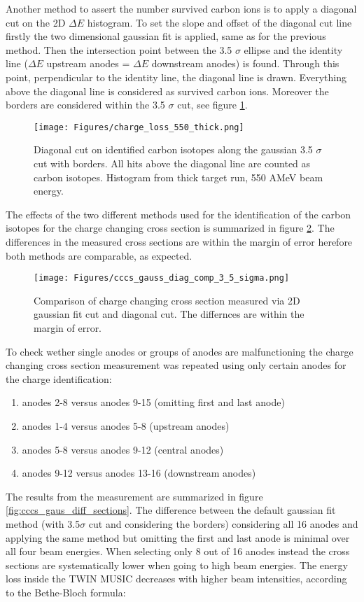 Another method to assert the number survived carbon ions is to apply a diagonal cut on the 2D $\Delta E$ histogram. To set the slope and offset of the diagonal cut line firstly the two dimensional gaussian fit is applied, same as for the previous method. Then the intersection point between the 3.5 $\sigma$ ellipse and the identity line ($\Delta E$ upstream anodes = $\Delta E$ downstream anodes) is found. Through this point, perpendicular to the identity line, the diagonal line is drawn. Everything above the diagonal line is considered as survived carbon ions. Moreover the borders are considered within the 3.5 $\sigma$ cut, see figure \ref{fig:diagonal_cut_twim}. 
\begin{figure}[htpb]
    \centering
    \texttt{[image: Figures/charge\_loss\_550\_thick.png]}
    \caption{
    Diagonal cut on identified carbon isotopes along the gaussian 3.5 $\sigma$ cut with borders. All hits above the diagonal line are counted as carbon isotopes. Histogram from thick target run, 550 AMeV beam energy.
     }
    \label{fig:diagonal_cut_twim}
\end{figure}
The effects of the two different methods used for the identification of the carbon isotopes for the charge changing cross section is summarized in figure \ref{fig:cccs_gaus_vs_diag}. The differences in the measured cross sections are within the margin of error herefore both methods are comparable, as expected.
\begin{figure}[htpb]
    \centering
    \texttt{[image: Figures/cccs\_gauss\_diag\_comp\_3\_5\_sigma.png]}
    \caption{
    Comparison of charge changing cross section measured via 2D gaussian fit cut and diagonal cut. The differnces are within the margin of error.
     }
    \label{fig:cccs_gaus_vs_diag}
\end{figure}
To check wether single anodes or groups of anodes are malfunctioning the charge changing cross section measurement was repeated using only certain anodes for the charge identification:
\begin{enumerate}[label=\alph*)]
\itemsep0em
\item anodes 2-8 versus anodes 9-15 (omitting first and last anode)
\item anodes 1-4 versus anodes 5-8 (upstream anodes)
\item anodes 5-8 versus anodes 9-12 (central anodes)
\item anodes 9-12 versus anodes 13-16 (downstream anodes)
\end{enumerate}
The results from the measurement are summarized in figure \ref{fig:cccs_gaus_diff_sections}. The difference between the default gaussian fit method (with 3.5$\sigma$ cut and considering the borders) considering all 16 anodes and applying the same method but omitting the first and last anode is minimal over all four beam energies. When selecting only 8 out of 16 anodes instead the cross sections are systematically lower when going to high beam energies. The energy loss inside the TWIN MUSIC decreases with higher beam intensities, according to the Bethe-Bloch formula:

